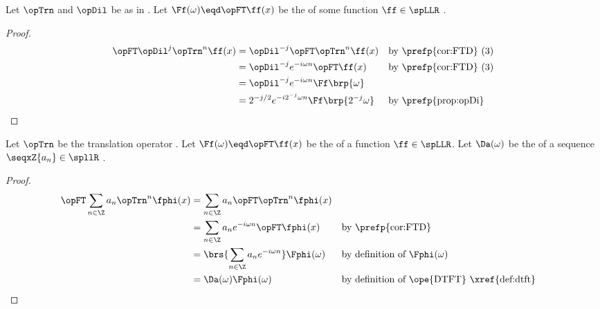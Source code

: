 \begin{proposition}
\label{prop:FTDf}
Let $\opTrn$ and $\opDil$ be as in .
Let $\Ff(\omega)\eqd\opFT\ff(x)$ be the   of some function $\ff\in\spLLR$ .
\end{proposition}
\begin{proof}
     \begin{align*}
       \opFT\opDil^j\opTrn^n\ff(x)
         &= \opDil^{-j}\opFT\opTrn^n\ff(x)
         && \text{by \prefp{cor:FTD} (3)}
       \\&= \opDil^{-j} e^{-i\omega n}\opFT\ff(x)
         && \text{by \prefp{cor:FTD} (3)}
       \\&= \opDil^{-j} e^{-i\omega n}\Ff\brp{\omega}
       \\&= 2^{-j/2} e^{-i2^{-j}\omega n}\Ff\brp{2^{-j}\omega}
         && \text{by \prefp{prop:opDi}}
     \end{align*}
\end{proof}

\begin{proposition}
\label{prop:Fsum_af}
Let $\opTrn$ be the translation operator .
Let $\Ff(\omega)\eqd\opFT\ff(x)$ be the   of a function $\ff\in\spLLR$.
Let $\Da(\omega)$ be the   of a sequence $\seqxZ{a_n}\in\spllR$ .
\end{proposition}
\begin{proof}
     \begin{align*}
       \opFT\sum_{n\in\Z}a_n \opTrn^n\fphi(x)
         &= \sum_{n\in\Z}a_n \opFT\opTrn^n\fphi(x)
       \\&= \sum_{n\in\Z}a_n e^{-i\omega n}\opFT\fphi(x)
         && \text{by \prefp{cor:FTD}}
       \\&= \brs{\sum_{n\in\Z}a_n e^{-i\omega n}}\Fphi(\omega)
         && \text{by definition of $\Fphi(\omega)$}
       \\&= \Da(\omega)\Fphi(\omega)
         && \text{by definition of \ope{DTFT} \xref{def:dtft}}
     \end{align*}
\end{proof}


